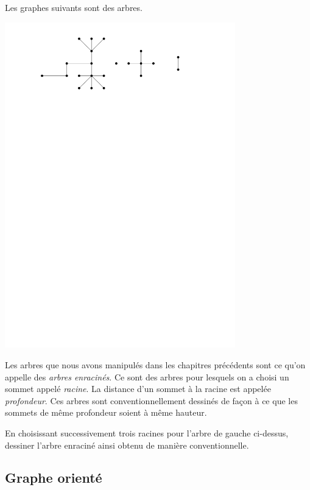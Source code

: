\documentclass{magnolia}
\begin{document}
\begin{remarques}
\remarque Les graphes suivants sont des arbres.
\begin{center}
\includegraphics[width = 10cm]{../../commun/images/info-cours-graphe-theorie-foret}
\end{center}
\remarque Les arbres que nous avons manipulés dans les chapitres précédents sont ce
  qu'on appelle des \emph{arbres enracinés}. Ce sont des arbres
  pour lesquels on a choisi un sommet appelé \emph{racine}. 
  La distance d'un sommet à la racine est appelée \emph{profondeur}.
  Ces arbres sont conventionnellement dessinés de façon à ce que les sommets de même
  profondeur soient à même hauteur.
\end{remarques}
\vspace{2ex}
\begin{exoUnique}
\exo En choisissant successivement trois racines pour l'arbre de gauche ci-dessus, dessiner
  l'arbre enraciné ainsi obtenu de manière conventionnelle.
\end{exoUnique}

\subsection{Graphe orienté}
\end{document}
